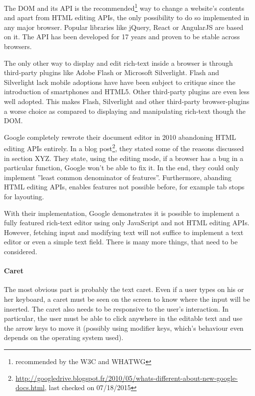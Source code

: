 The DOM and its API is the recommended\footnote{recommended by the W3C and WHATWG} way to change a website's contents and apart from HTML editing APIs, the only possibility to do so implemented in any major browser. Popular libraries like jQuery, React or AngularJS are based on it. The API has been developed for 17 years and proven to be stable across browsers.

The only other way to display and edit rich-text inside a browser is through third-party plugins like Adobe Flash or Microsoft Silverlight. Flash and Silverlight lack mobile adoptions have have been subject to critique since the introduction of smartphones and HTML5. Other third-party plugins are even less well adopted. This makes Flash, Silverlight and other third-party browser-plugins a worse choice as compared to displaying and manipulating rich-text though the DOM.

Google completely rewrote their document editor in 2010 abandoning HTML editing APIs entirely. In a blog post\footnote{\url{http://googledrive.blogspot.fr/2010/05/whats-different-about-new-google-docs.html}, last checked on 07/18/2015}, they stated some of the reasons discussed in section XYZ. They state, using the editing mode, if a browser has a bug in a particular function, Google won't be able to fix it. In the end, they could only implement ''least common denominator of features''. Furthermore, abanding HTML editing APIs, enables features not possible before, for example tab stops for layouting. 

With their implementation, Google demonstrates it is possible to implement a fully featured rich-text editor using only JavaScript and not HTML editing APIs. However, fetching input and modifying text will not suffice to implement a text editor or even a simple text field. There is many more things, that need to be considered. 

\paragraph{Caret} The most obvious part is probably the text caret. Even if a user types on his or her keyboard, a caret must be seen on the screen to know where the input will be inserted. The caret also needs to be responsive to the user's interaction. In particular, the user must be able to click anywhere in the editable text and use the arrow keys to move it (possibly using modifier keys, which's behaviour even depends on the operating system used).

